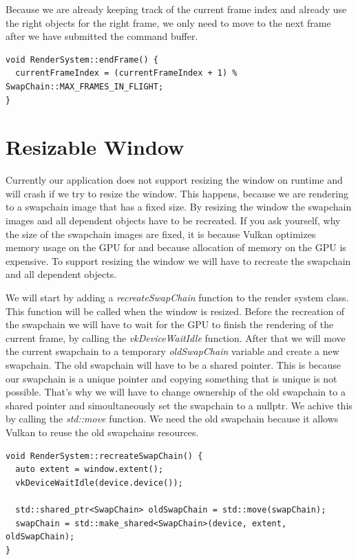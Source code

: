 \documentclass[12pt]{report} \usepackage{preamble}
\begin{document}
Because we are already keeping track of the current frame index and already use the right objects for the right frame, we only need to
move to the next frame after we have submitted the command buffer.

\begin{lstlisting}[Language=C++]
void RenderSystem::endFrame() {
  currentFrameIndex = (currentFrameIndex + 1) % SwapChain::MAX_FRAMES_IN_FLIGHT;
}
\end{lstlisting}

\section{Resizable Window}

Currently our application does not support resizing the window on runtime and will crash if we try to resize the window. This
happens, because we are rendering to a swapchain image that has a fixed size. By resizing the window the swapchain images and all
dependent objects have to be recreated. If you ask yourself, why the size of the swapchain images are fixed, it is because
Vulkan optimizes memory usage on the GPU for and because allocation of memory on the GPU is expensive. To support resizing the window
we will have to recreate the swapchain and all dependent objects.

We will start by adding a \textit{recreateSwapChain} function to the render system class. This function will be called when the window is resized.
Before the recreation of the swapchain we will have to wait for the GPU to finish the rendering of the current frame, by calling the
\textit{vkDeviceWaitIdle} function. After that we will move the current swapchain to a temporary \textit{oldSwapChain} variable and create a new swapchain.
The old swapchain will have to be a shared pointer. This is because our swapchain is a unique pointer and copying something that is unique is not possible.
That's why we will have to change ownership of the old swapchain to a shared pointer and simoultaneously set the swapchain to a nullptr.
We achive this by calling the \textit{std::move} function. We need the old swapchain because it allows Vulkan to reuse the old swapchains resources.

\begin{lstlisting}[Language=C++]
void RenderSystem::recreateSwapChain() {
  auto extent = window.extent();
  vkDeviceWaitIdle(device.device());

  std::shared_ptr<SwapChain> oldSwapChain = std::move(swapChain);
  swapChain = std::make_shared<SwapChain>(device, extent, oldSwapChain);
}
\end{lstlisting}
\end{document}
